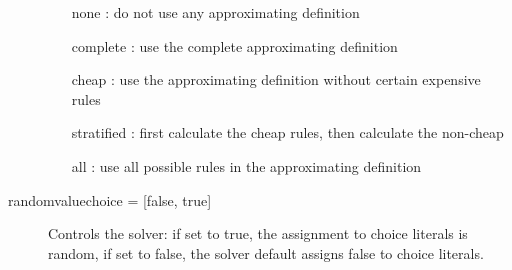 \begin{description}
		\begin{itemize}
		\item [none]: do not use any approximating definition
		\item [complete]: use the complete approximating definition
		\item [cheap]: use the approximating definition without certain expensive rules
		\item [stratified]: first calculate the cheap rules, then calculate the non-cheap
		\item [all]: use all possible rules in the approximating definition
		\end{itemize}
	\item[{randomvaluechoice = [false, true]}] Controls the solver: if set to true, the assignment to choice literals is random, if set to false, the solver default assigns false to choice literals.
\end{description}
